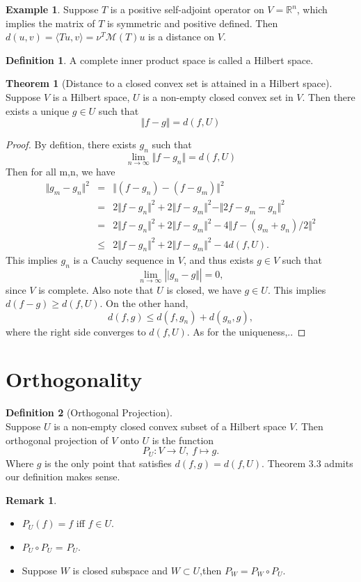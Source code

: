 \documentclass[12pt]{book}
\theoremstyle{definition}
\newtheorem{definition}{Definition}[chapter]
\newtheorem{example}{Example}[chapter]
\newtheorem{theorem}{Theorem}[chapter]
\newtheorem{remark}{Remark}
\newcommand{\inner}[2]{{\langle #1,#2\rangle}}
\newcommand{\R}{\mathbb{R}}
\newcommand{\M}{\mathcal{M}}
\begin{document}
\begin{example}
Suppose $T$ is a positive self-adjoint operator on $V=\R^n$, which implies the matrix of $T$ is symmetric and positive defined. Then $d(u,v)=\inner{Tu}{v}=\nu^T\M(T)u$ is a distance on $V$.	
\end{example}

\begin{definition}
A complete inner product space is called a Hilbert space.	
\end{definition}

\begin{theorem}[Distance to a closed convex set is attained in a Hilbert space] \ \\
Suppose $V$ is a Hilbert space, $U$ is a non-empty closed convex set in $V$. Then there exists a unique $g\in U$ such that 
$$
\Vert f-g \Vert = d(f,U)
$$
\end{theorem}
\begin{proof}
By defition, there exists $g_n$ such that 
$$
\lim_{n \to \infty} \Vert f-g_n \Vert= d(f,U)
$$
Then for all m,n, we have 
\begin{eqnarray*}
	\Vert g_m-g_n\Vert^2 &=& \Vert (f-g_n)-(f-g_m)\Vert^2 \\
	&=& 2\Vert f-g_n\Vert^2 + 2\Vert f-g_m\Vert^2 - \Vert 2f-g_m-g_n\Vert^2 \\
	&=& 2\Vert f-g_n\Vert^2 + 2\Vert f-g_m\Vert^2 - 4 \Vert f-(g_m+g_n)/2\Vert^2 \\
	&\leq &  2\Vert f-g_n\Vert^2 + 2\Vert f-g_m\Vert^2 - 4d(f,U). 
\end{eqnarray*}
This implies $g_n$ is a Cauchy sequence in $V$, and thus exists $g\in V$ such that 
$$
\lim_{n \to \infty}|\vert g_n -g\Vert| = 0,
$$
since $V$ is complete. Also note that $U$ is closed, we have $g\in U$. This implies $d(f-g)\geq d(f,U)$. On the other hand,
$$
d(f,g) \leq d(f,g_n)+d(g_n,g),
$$
where the right side converges to $d(f,U)$. As for the uniqueness,..
\end{proof}
\section{Orthogonality}
\begin{definition}[Orthogonal Projection] \ \\
Suppose $U$ is a non-empty closed convex subset of a Hilbert space $V$. Then orthogonal projection of $V$ onto $U$ is the function
$$
P_U: V \to U, \ f\mapsto g. 
$$
Where $g$ is the only point that satisfies $d(f,g)=d(f,U)$. Theorem 3.3 admits our definition makes sense.
\end{definition}
\begin{remark}\
\begin{itemize}
	\item $P_U(f)=f$ iff $f\in U$.
	\item $P_U \circ P_U$ = $P_U$.
	\item Suppose $W$ is closed subspace and $W \subset U$,then $P_W=P_W \circ P_U$.
\end{itemize}
\end{remark}
\end{document}
